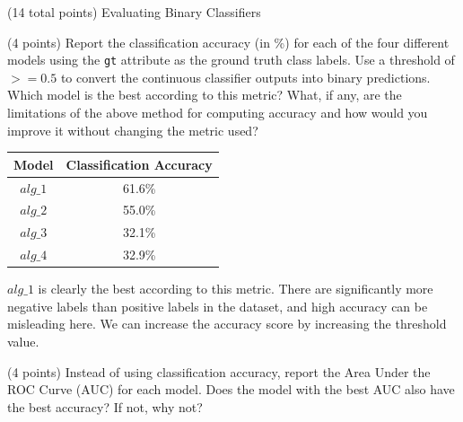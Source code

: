 \documentclass[12pt]{article}
\begin{document}
\clearpage


\begin{question}{(14 total points) Evaluating Binary Classifiers}





%
%
\begin{subquestion}{(4 points) Report the classification accuracy (in \%) for each of the four different models using the \texttt{gt} attribute as the ground truth class labels. 
Use a threshold of $>= 0.5$ to convert the continuous classifier outputs into binary predictions. 
Which model is the best according to this metric?
What, if any, are the limitations of the above method for computing accuracy and how would you improve it without changing the metric used?
}


\begin{answerbox}{15em}
\begin{center}
    \begin{tabular}{|c|c|}
    \hline
    Model & Classification Accuracy \\ \hline
    $alg\_1$ & 61.6\% \\
    $alg\_2$ & 55.0\% \\
    $alg\_3$ & 32.1\% \\
    $alg\_4$ & 32.9\% \\
    \hline
    \end{tabular}
\end{center}
$alg\_1$ is clearly the best according to this metric. There are significantly more negative labels than positive labels in the dataset, and high accuracy can be misleading here. We can increase the accuracy score by increasing the threshold value.
\end{answerbox}



\end{subquestion}



%
%
\begin{subquestion}{(4 points) Instead of using classification accuracy, report the Area Under the ROC Curve (AUC) for each model. 
Does the model with the best AUC also have the best accuracy? If not, why not?\\
}



\end{subquestion}
\end{question}
\end{document}
